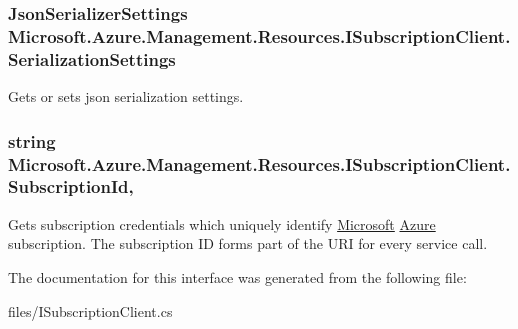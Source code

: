 \subsubsection[{\texorpdfstring{Serialization\+Settings}{SerializationSettings}}]{\setlength{\rightskip}{0pt plus 5cm}Json\+Serializer\+Settings Microsoft.\+Azure.\+Management.\+Resources.\+I\+Subscription\+Client.\+Serialization\+Settings\hspace{0.3cm}{\ttfamily [get]}}\hypertarget{interface_microsoft_1_1_azure_1_1_management_1_1_resources_1_1_i_subscription_client_a56b59fb47022a9b49b4ee3e828d2d070}{}\label{interface_microsoft_1_1_azure_1_1_management_1_1_resources_1_1_i_subscription_client_a56b59fb47022a9b49b4ee3e828d2d070}


Gets or sets json serialization settings. 

\subsubsection[{\texorpdfstring{Subscription\+Id}{SubscriptionId}}]{\setlength{\rightskip}{0pt plus 5cm}string Microsoft.\+Azure.\+Management.\+Resources.\+I\+Subscription\+Client.\+Subscription\+Id\hspace{0.3cm}{\ttfamily [get]}, {\ttfamily [set]}}\hypertarget{interface_microsoft_1_1_azure_1_1_management_1_1_resources_1_1_i_subscription_client_aa7170040fe7cc8a8c209ae6857a54cbf}{}\label{interface_microsoft_1_1_azure_1_1_management_1_1_resources_1_1_i_subscription_client_aa7170040fe7cc8a8c209ae6857a54cbf}


Gets subscription credentials which uniquely identify \hyperlink{namespace_microsoft}{Microsoft} \hyperlink{namespace_microsoft_1_1_azure}{Azure} subscription. The subscription ID forms part of the U\+RI for every service call. 



The documentation for this interface was generated from the following file\+:\begin{DoxyCompactItemize}
\item 
files/I\+Subscription\+Client.\+cs\end{DoxyCompactItemize}

